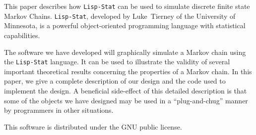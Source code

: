 This paper describes how {\tt Lisp-Stat} can be used to simulate discrete 
finite state Markov Chains.  {\tt Lisp-Stat},  developed by
Luke~Tierney of the University of Minnesota,  is a powerful
object-oriented programming language with statistical capabilities. 

The software we have developed will graphically simulate a Markov
chain using the {\tt Lisp-Stat} language.  It can be used to
illustrate the validity of several important theoretical results
concerning the properties of a Markov chain.  In this paper, we
give a complete description of our design and the code used to
implement the design.  A beneficial side-effect of this detailed
description is that some of the objects we have designed may be used
in a ``plug-and-chug'' manner by programmers in other situations. 

This software is distributed under the GNU public license. 



